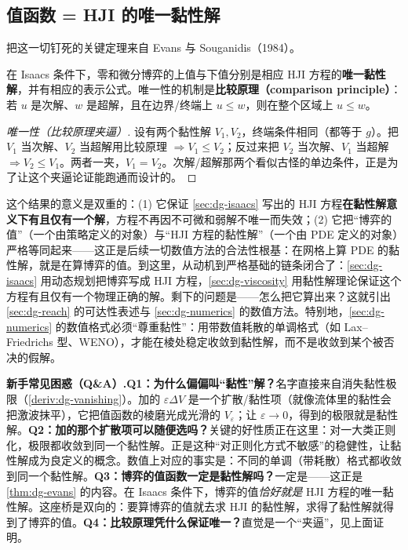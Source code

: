 \subsection{值函数 = HJI 的唯一黏性解}
\label{sec:dg-unique}
把这一切钉死的关键定理来自 Evans 与 Souganidis（1984）\cite{evans1984differential}。

\begin{theorem}[博弈值 = 唯一黏性解（Evans--Souganidis 1984）]
\label{thm:dg-evans}
在 Isaacs 条件下，零和微分博弈的上值与下值分别是相应 HJI 方程的\textbf{唯一黏性解}，并有相应的表示公式。唯一性的机制是\textbf{比较原理（comparison principle）}：若 $u$ 是次解、$w$ 是超解，且在边界/终端上 $u\le w$，则在整个区域上 $u\le w$。
\end{theorem}
\begin{proof}[唯一性（比较原理夹逼）]
设有两个黏性解 $V_1,V_2$，终端条件相同（都等于 $g$）。把 $V_1$ 当次解、$V_2$ 当超解用比较原理 $\Rightarrow V_1\le V_2$；反过来把 $V_2$ 当次解、$V_1$ 当超解 $\Rightarrow V_2\le V_1$。两者一夹，$V_1=V_2$。次解/超解那两个看似古怪的单边条件，正是为了让这个夹逼论证能跑通而设计的。
\end{proof}

这个结果的意义是双重的：(1) 它保证 \cref{sec:dg-isaacs} 写出的 HJI 方程\textbf{在黏性解意义下有且仅有一个解}，方程不再因不可微和弱解不唯一而失效；(2) 它把“博弈的值”（一个由策略定义的对象）与“HJI 方程的黏性解”（一个由 PDE 定义的对象）严格等同起来——这正是后续一切数值方法的合法性根基：在网格上算 PDE 的黏性解，就是在算博弈的值。到这里，从动机到严格基础的链条闭合了：\cref{sec:dg-isaacs} 用动态规划把博弈写成 HJI 方程，\cref{sec:dg-viscosity} 用黏性解理论保证这个方程有且仅有一个物理正确的解。剩下的问题是——怎么把它算出来？这就引出 \cref{sec:dg-reach} 的可达性表述与 \cref{sec:dg-numerics} 的数值方法。特别地，\cref{sec:dg-numerics} 的数值格式必须“尊重黏性”：用带数值耗散的单调格式（如 Lax--Friedrichs 型、WENO），才能在棱处稳定收敛到黏性解，而不是收敛到某个被否决的假解。

\begin{note}
\textbf{新手常见困惑（Q\&A）.}\;\textbf{Q1：为什么偏偏叫“黏性”解？}\;名字直接来自消失黏性极限（\cref{deriv:dg-vanishing}）。加的 $\varepsilon\Delta V$ 是一个扩散/黏性项（就像流体里的黏性会把激波抹平），它把值函数的棱磨光成光滑的 $V_\varepsilon$；让 $\varepsilon\to0$，得到的极限就是黏性解。\textbf{Q2：加的那个扩散项可以随便选吗？}\;关键的好性质正在这里：对一大类正则化，极限都收敛到同一个黏性解。正是这种“对正则化方式不敏感”的稳健性，让黏性解成为良定义的概念。数值上对应的事实是：不同的单调（带耗散）格式都收敛到同一个黏性解。\textbf{Q3：博弈的值函数一定是黏性解吗？}\;一定是——这正是 \cref{thm:dg-evans} 的内容。在 Isaacs 条件下，博弈的值\emph{恰好就是} HJI 方程的唯一黏性解。这座桥是双向的：要算博弈的值就去求 HJI 的黏性解，求得了黏性解就得到了博弈的值。\textbf{Q4：比较原理凭什么保证唯一？}\;直觉是一个“夹逼”，见上面证明。
\end{note}

